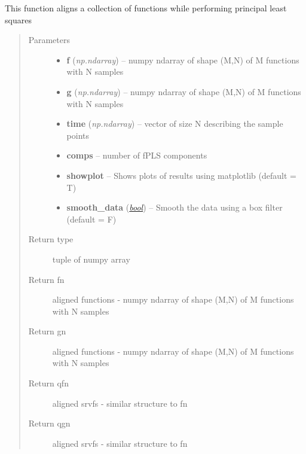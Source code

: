 \documentclass[letterpaper,10pt,english]{sphinxmanual}
\begin{document}
\begin{fulllineitems}
\label{time_warping:time_warping.align_fPLS}
This function aligns a collection of functions while performing principal least squares
\begin{quote}\begin{description}
\item[{Parameters}] \leavevmode\begin{itemize}
\item {} 
\textbf{f} (\emph{np.ndarray}) -- numpy ndarray of shape (M,N) of M functions with N samples

\item {} 
\textbf{g} (\emph{np.ndarray}) -- numpy ndarray of shape (M,N) of M functions with N samples

\item {} 
\textbf{time} (\emph{np.ndarray}) -- vector of size N describing the sample points

\item {} 
\textbf{comps} -- number of fPLS components

\item {} 
\textbf{showplot} -- Shows plots of results using matplotlib (default = T)

\item {} 
\textbf{smooth\_data} (\href{http://docs.python.org/library/functions.html\#bool}{\emph{bool}}) -- Smooth the data using a box filter (default = F)

\end{itemize}

\item[{Return type}] \leavevmode
tuple of numpy array

\item[{Return fn}] \leavevmode
aligned functions - numpy ndarray of shape (M,N) of M functions with N samples

\item[{Return gn}] \leavevmode
aligned functions - numpy ndarray of shape (M,N) of M functions with N samples

\item[{Return qfn}] \leavevmode
aligned srvfs - similar structure to fn

\item[{Return qgn}] \leavevmode
aligned srvfs - similar structure to fn


\end{description}
\end{quote}
\end{fulllineitems}
\end{document}
